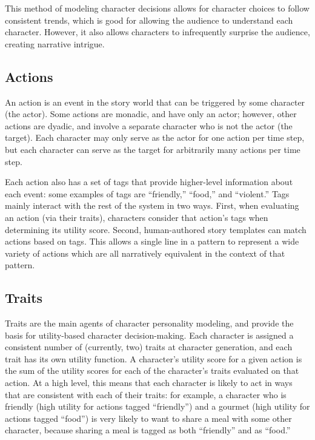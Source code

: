 \documentclass[letterpaper]{article}
\begin{document}
This method of modeling character decisions allows for character choices to follow
consistent trends, which is good for allowing the audience to understand each character.
However, it also allows characters to infrequently surprise the audience, creating
narrative intrigue.

\subsection{Actions}
An action is an event in the story world that can be triggered by some character (the
actor). Some actions are monadic, and have only an actor; however, other actions are
dyadic, and involve a separate character who is not the actor (the target). Each character
may only serve as the actor for one action per time step, but each character can serve as
the target for arbitrarily many actions per time step.

Each action also has a set of tags that provide higher-level information about each event:
some examples of tags are ``friendly,'' ``food,'' and ``violent.'' Tags mainly interact
with the rest of the system in two ways. First, when evaluating an action (via their
traits), characters consider that action's tags when determining its utility score.
Second, human-authored story templates can match actions based on tags. This allows a
single line in a pattern to represent a wide variety of actions which are all narratively
equivalent in the context of that pattern.

\subsection{Traits}
Traits are the main agents of character personality modeling, and provide the basis for
utility-based character decision-making. Each character is assigned a consistent number of
(currently, two) traits at character generation, and each trait has its own utility
function. A character's utility score for a given action is the sum of the utility scores
for each of the character's traits evaluated on that action. At a high level, this means
that each character is likely to act in ways that are consistent with each of their
traits: for example, a character who is friendly (high utility for actions tagged
``friendly'') and a gourmet (high utility for actions tagged ``food'') is very likely to want to
share a meal with some other character, because sharing a meal is tagged as both
``friendly'' and as ``food.'' 
\end{document}
